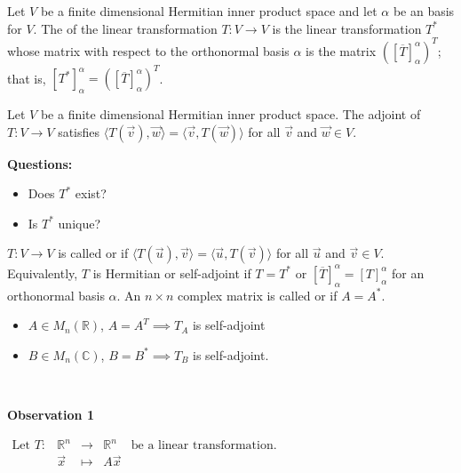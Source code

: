 \documentclass[11pt,fleqn]{book} %
\begin{document}
\setcounter{chapter}{5}
\setcounter{section}{3}
\setcounter{definitionT}{6}
\begin{definition}[Adjoint]
    Let $V$ be a finite dimensional Hermitian inner product space and let $\alpha$ be an  basis for $V$. The  of the linear transformation $T: V \to V$ is the linear transformation $T^*$ whose matrix with respect to the orthonormal basis $\alpha$ is the matrix $([\overline{T}]_\alpha^\alpha)^T$; that is, $[T^*]_\alpha^\alpha = ([\overline{T}]_\alpha^\alpha)^T$.
\end{definition}

\setcounter{dummy}{7}
\begin{proposition}
    Let $V$ be a finite dimensional Hermitian inner product space. The adjoint of $T: V \to V$ satisfies $\langle T(\vec{v}), \vec{w} \rangle = \langle \vec{v}, T(\vec{w}) \rangle$ for all $\vec{v}$ and $\vec{w} \in V$.
\end{proposition}

\textbf{Questions: }
\begin{itemize}
    \item Does $T^*$ exist?
    \item Is $T^*$ unique?
\end{itemize}

\setcounter{definitionT}{8}
\begin{definition}
    $T: V \to V$ is called  or  if $\langle T(\vec{u}), \vec{v} \rangle = \langle \vec{u}, T(\vec{v}) \rangle$ for all $\vec{u}$ and $\vec{v} \in V$. Equivalently, $T$ is Hermitian or self-adjoint if $T = T^*$ or $[\overline{T}]_\alpha^\alpha = [T]_\alpha^\alpha$ for an orthonormal basis $\alpha$. An $n \times n$ complex matrix is called  or  if $A = A^*$.
\end{definition}
\setcounter{section}{5}
\setcounter{chapter}{3}
\begin{itemize}
    \item $A \in M_n(\mathbb{R})$, $A = A^T \implies T_A$ is self-adjoint
    \item $B \in M_n(\mathbb{C})$, $B = B^* \implies T_B$ is self-adjoint.
\end{itemize}

{~~~}

\textbf{Observation 1}

$\begin{matrix} \text{Let }T: &\mathbb{R}^n &\to &\mathbb{R} ^n &\text{be a linear transformation. }\\ &\vec{x} &\mapsto &A\vec{x} \end{matrix}$
\end{document}
